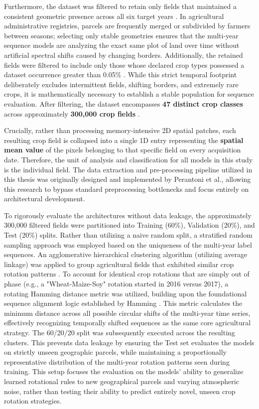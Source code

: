 Furthermore, the dataset was filtered to retain only fields that maintained a consistent geometric presence across all six target years \cite{perantoni_bayesian_2024}.
In agricultural administrative registries, parcels are frequently merged or subdivided by farmers between seasons;
selecting only stable geometries ensures that the multi-year sequence models are analyzing
the exact same plot of land over time without artificial spectral shifts caused by changing borders.
Additionally, the retained fields were filtered to include only those whose declared crop types
possessed a dataset occurrence greater than 0.05\% \cite{perantoni_bayesian_2024}.
While this strict temporal footprint deliberately excludes intermittent fields, shifting borders,
and extremely rare crops, it is mathematically necessary to establish a stable population for sequence evaluation.
After filtering, the dataset encompasses \textbf{47 distinct crop classes} across approximately \textbf{300,000 crop fields} \cite{perantoni_bayesian_2024}.

Crucially, rather than processing memory-intensive 2D spatial patches, each resulting crop field is collapsed into a
single 1D entry representing the \textbf{spatial mean value} of the pixels belonging to that specific field on every acquisition date.
Therefore, the unit of analysis and classification for all models in this study is the individual field.
The data extraction and pre-processing pipeline utilized in this thesis was originally designed and implemented by Perantoni et al.,
allowing this research to bypass standard preprocessing bottlenecks and focus entirely on architectural development.

To rigorously evaluate the architectures without data leakage, the approximately 300,000 filtered
fields were partitioned into Training (60\%), Validation (20\%), and Test (20\%) splits.
Rather than utilizing a naive random split, a stratified random sampling approach was employed based on the
uniqueness of the multi-year label sequences.
An agglomerative hierarchical clustering algorithm (utilizing average linkage) was
applied to group agricultural fields that exhibited similar crop rotation patterns \cite{perantoni_bayesian_2024}.
To account for identical crop rotations that are simply out of phase (e.g., a "Wheat-Maize-Soy" rotation started in 2016 versus 2017),
a rotating Hamming distance metric was utilized, building upon the foundational sequence alignment logic established by Hamming \cite{hamming1950error}.
This metric calculates the minimum distance across all possible circular shifts of the multi-year time series,
effectively recognizing temporally shifted sequences as the same core agricultural strategy.
The 60/20/20 split was subsequently executed across the resulting clusters.
This prevents data leakage by ensuring the Test set evaluates the models on strictly unseen geographic parcels, 
while maintaining a proportionally representative distribution of the multi-year rotation patterns seen during training. 
This setup focuses the evaluation on the models' ability to generalize learned rotational rules to new geographical parcels and varying atmospheric noise, 
rather than testing their ability to predict entirely novel, unseen crop rotation strategies.

